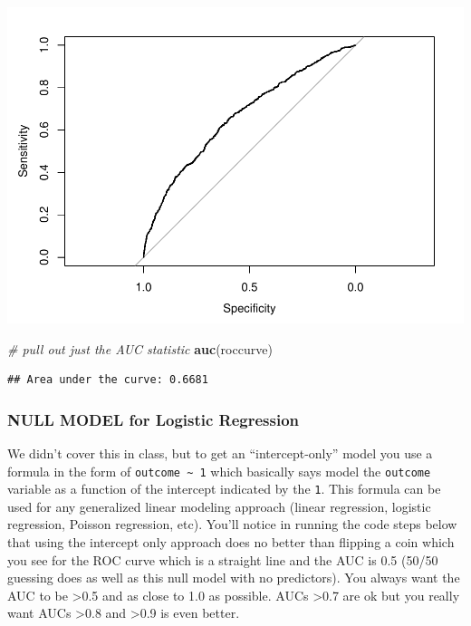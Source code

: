 \documentclass[]{article}
\newenvironment{Shaded}{\begin{snugshade}}{\end{snugshade}}
\newcommand{\KeywordTok}[1]{\textcolor[rgb]{0.13,0.29,0.53}{\textbf{{#1}}}}
\newcommand{\StringTok}[1]{\textcolor[rgb]{0.31,0.60,0.02}{{#1}}}
\newcommand{\CommentTok}[1]{\textcolor[rgb]{0.56,0.35,0.01}{\textit{{#1}}}}
\newcommand{\NormalTok}[1]{{#1}}
\begin{document}
\begin{Shaded}
\end{Shaded}

\includegraphics{Hmwk7AnswerKey_files/figure-latex/unnamed-chunk-7-2.pdf}

\begin{Shaded}
\begin{Highlighting}[]
\CommentTok{# pull out just the AUC statistic}
\KeywordTok{auc}\NormalTok{(roccurve)}
\end{Highlighting}
\end{Shaded}

\begin{verbatim}
## Area under the curve: 0.6681
\end{verbatim}

\subsubsection{NULL MODEL for Logistic
Regression}\label{null-model-for-logistic-regression}

We didn't cover this in class, but to get an ``intercept-only'' model
you use a formula in the form of \texttt{outcome\ \textasciitilde{}\ 1}
which basically says model the \texttt{outcome} variable as a function
of the intercept indicated by the \texttt{1}. This formula can be used
for any generalized linear modeling approach (linear regression,
logistic regression, Poisson regression, etc). You'll notice in running
the code steps below that using the intercept only approach does no
better than flipping a coin which you see for the ROC curve which is a
straight line and the AUC is 0.5 (50/50 guessing does as well as this
null model with no predictors). You always want the AUC to be
\textgreater{}0.5 and as close to 1.0 as possible. AUCs
\textgreater{}0.7 are ok but you really want AUCs \textgreater{}0.8 and
\textgreater{}0.9 is even better.
\end{document}
